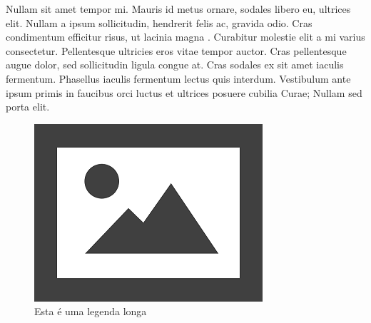 \documentclass{article}
\begin{document}
	Nullam sit amet tempor mi. Mauris id metus ornare, sodales libero eu, ultrices elit. Nullam a ipsum sollicitudin, hendrerit felis ac, gravida odio. Cras condimentum efficitur risus, ut lacinia magna \cite{ICNF2013a} . Curabitur molestie elit a mi varius consectetur. Pellentesque ultricies eros vitae tempor auctor. Cras pellentesque augue dolor, sed sollicitudin ligula congue at. Cras sodales ex sit amet iaculis fermentum. Phasellus iaculis fermentum lectus quis interdum. Vestibulum ante ipsum primis in faucibus orci luctus et ultrices posuere cubilia Curae; Nullam sed porta elit.
	
	\begin{figure}[H]
		\centering
		\includegraphics[width=0.5\linewidth]{Figuras/fig3}
		\caption[Legenda curta]{Esta é uma legenda longa}
		\label{fig:fig3}
	\end{figure}
	
	
	
	
	
	
	
	
	
\end{document}
